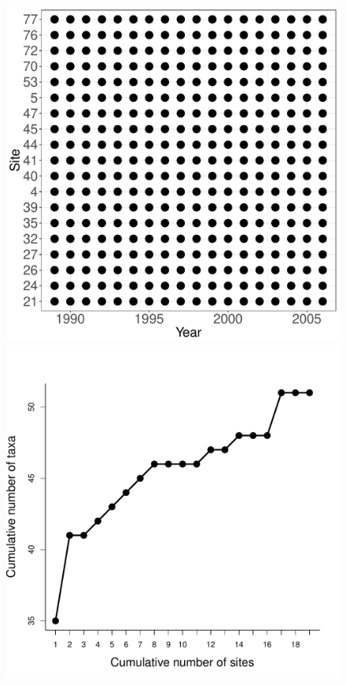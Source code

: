 \documentclass[11pt, oneside]{article}
\begin{document}
\begin{figure}[h!]
\includegraphics[scale = 0.4]{cdr-grasshopper-compagnoni_spatiotemporal_sampling_effort.pdf}
\includegraphics[scale = 0.4]{cdr-grasshopper-compagnoni_species_accumulation_space.pdf}

\end{figure}
\end{document}
